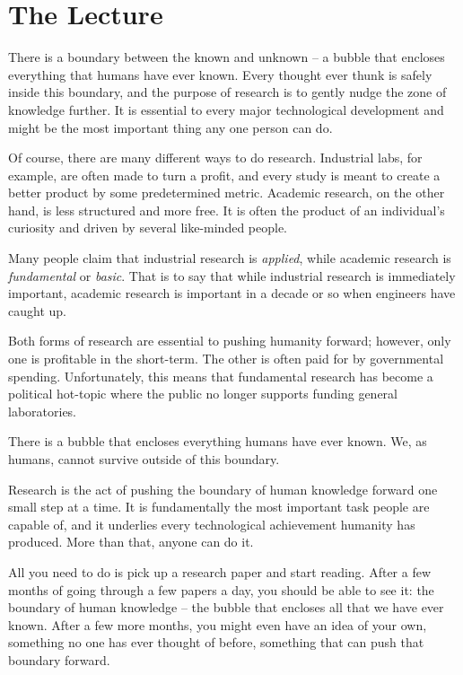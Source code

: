 \chapter{The Lecture}

There is a boundary between the known and unknown -- a bubble that encloses everything that humans have ever known.
Every thought ever thunk is safely inside this boundary, and the purpose of research is to gently nudge the zone of knowledge further.
It is essential to every major technological development and might be the most important thing any one person can do.

Of course, there are many different ways to do research.
Industrial labs, for example, are often made to turn a profit, and every study is meant to create a better product by some predetermined metric.
Academic research, on the other hand, is less structured and more free.
It is often the product of an individual's curiosity and driven by several like-minded people.

Many people claim that industrial research is \textit{applied}, while academic research is \textit{fundamental} or \textit{basic}.
That is to say that while industrial research is immediately important, academic research is important in a decade or so when engineers have caught up.

Both forms of research are essential to pushing humanity forward; however, only one is profitable in the short-term.
The other is often paid for by governmental spending.
Unfortunately, this means that fundamental research has become a political hot-topic where the public no longer supports funding general laboratories.


There is a bubble that encloses everything humans have ever known.
We, as humans, cannot survive outside of this boundary.

Research is the act of pushing the boundary of human knowledge forward one small step at a time.
It is fundamentally the most important task people are capable of, and it underlies every technological achievement humanity has produced.
More than that, anyone can do it.

All you need to do is pick up a research paper and start reading.
After a few months of going through a few papers a day, you should be able to see it: the boundary of human knowledge -- the bubble that encloses all that we have ever known.
After a few more months, you might even have an idea of your own, something no one has ever thought of before, something that can push that boundary forward.

